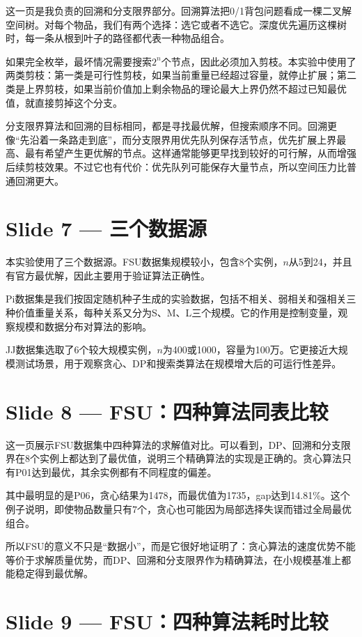 \documentclass[12pt,a4paper]{ctexart}
\begin{document}
这一页是我负责的回溯和分支限界部分。回溯算法把0/1背包问题看成一棵二叉解空间树。对每个物品，我们有两个选择：选它或者不选它。深度优先遍历这棵树时，每一条从根到叶子的路径都代表一种物品组合。

如果完全枚举，最坏情况需要搜索$2^n$个节点，因此必须加入剪枝。本实验中使用了两类剪枝：第一类是可行性剪枝，如果当前重量已经超过容量，就停止扩展；第二类是上界剪枝，如果当前价值加上剩余物品的理论最大上界仍然不超过已知最优值，就直接剪掉这个分支。

分支限界算法和回溯的目标相同，都是寻找最优解，但搜索顺序不同。回溯更像“先沿着一条路走到底”，而分支限界用优先队列保存活节点，优先扩展上界最高、最有希望产生更优解的节点。这样通常能够更早找到较好的可行解，从而增强后续剪枝效果。不过它也有代价：优先队列可能保存大量节点，所以空间压力比普通回溯更大。

\section*{Slide 7 — 三个数据源}

本实验使用了三个数据源。FSU数据集规模较小，包含8个实例，$n$从5到24，并且有官方最优解，因此主要用于验证算法正确性。

Pi数据集是我们按固定随机种子生成的实验数据，包括不相关、弱相关和强相关三种价值重量关系，每种关系又分为S、M、L三个规模。它的作用是控制变量，观察规模和数据分布对算法的影响。

JJ数据集选取了6个较大规模实例，$n$为400或1000，容量为100万。它更接近大规模测试场景，用于观察贪心、DP和搜索类算法在规模增大后的可运行性差异。

\section*{Slide 8 — FSU：四种算法同表比较}

这一页展示FSU数据集中四种算法的求解值对比。可以看到，DP、回溯和分支限界在8个实例上都达到了最优值，说明三个精确算法的实现是正确的。贪心算法只有P01达到最优，其余实例都有不同程度的偏差。

其中最明显的是P06，贪心结果为1478，而最优值为1735，gap达到14.81\%。这个例子说明，即使物品数量只有7个，贪心也可能因为局部选择失误而错过全局最优组合。

所以FSU的意义不只是“数据小”，而是它很好地证明了：贪心算法的速度优势不能等价于求解质量优势，而DP、回溯和分支限界作为精确算法，在小规模基准上都能稳定得到最优解。

\section*{Slide 9 — FSU：四种算法耗时比较}
\end{document}
